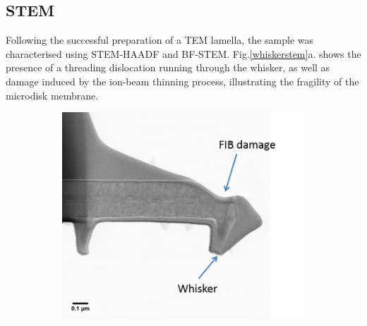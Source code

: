 \subsection{STEM}

Following the successful preparation of a TEM lamella, the sample was characterised using STEM-HAADF and BF-STEM. Fig.\ref{whiskerstem}a. shows the presence of a threading dislocation running through the whisker, as well as damage induced by the ion-beam thinning process, illustrating the fragility of the microdisk membrane.

\begin{figure}[h]
	\hspace*{0.5cm}
	\begin{subfigure}[b]{0.48\textwidth}
		\centering
		\includegraphics[width=1\linewidth]{Figs/Ch4/whiskBF}
		\caption{}
		

\end{subfigure}
\end{figure}
